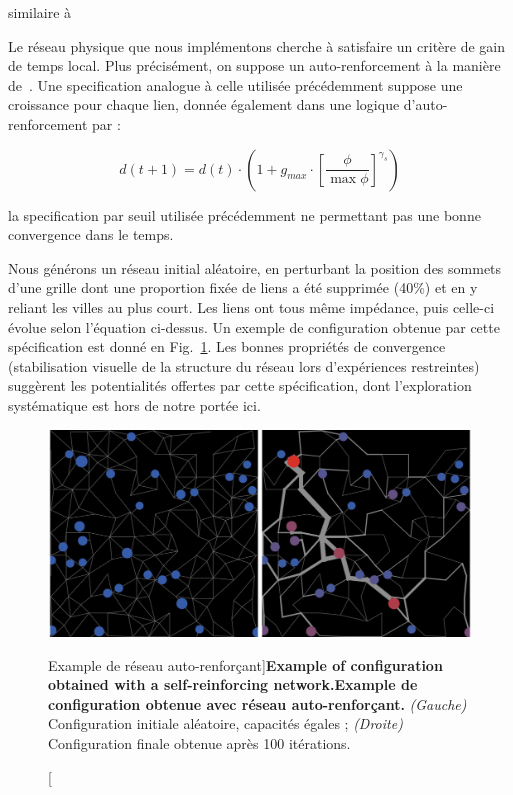 similaire à \cite{li2014modeling}

Le réseau physique que nous implémentons cherche à satisfaire un critère de gain de temps local. Plus précisément, on suppose un auto-renforcement à la manière de~\cite{tero2010rules}. Une specification analogue à celle utilisée précédemment suppose une croissance pour chaque lien, donnée également dans une logique d'auto-renforcement par :

\[
d(t+1) = d(t)\cdot \left(1 + g_{max} \cdot \left[\frac{\phi}{\max \phi}\right]^{\gamma_s}\right)
\]


la specification par seuil utilisée précédemment ne permettant pas une bonne convergence dans le temps.


Nous générons un réseau initial aléatoire, en perturbant la position des sommets d'une grille dont une proportion fixée de liens a été supprimée (40\%) et en y reliant les villes au plus court. Les liens ont tous même impédance, puis celle-ci évolue selon l'équation ci-dessus. Un exemple de configuration obtenue par cette spécification est donné en Fig.~\ref{fig:macrocoevolution:slimemould}. Les bonnes propriétés de convergence (stabilisation visuelle de la structure du réseau lors d'expériences restreintes) suggèrent les potentialités offertes par cette spécification, dont l'exploration systématique est hors de notre portée ici.


\begin{figure}
	\includegraphics[width=\linewidth]{Figures/Final/6-2-3-fig-macrocoevol-slimemould}
	\caption[Example of self-reinforcing network][Example de réseau auto-renforçant]{\textbf{Example of configuration obtained with a self-reinforcing network.}\label{fig:macrocoevolution:slimemould}}{\textbf{Example de configuration obtenue avec réseau auto-renforçant.} \textit{(Gauche)} Configuration initiale aléatoire, capacités égales ; \textit{(Droite)} Configuration finale obtenue après 100 itérations.\label{fig:macrocoevolution:slimemould}}
\end{figure}


